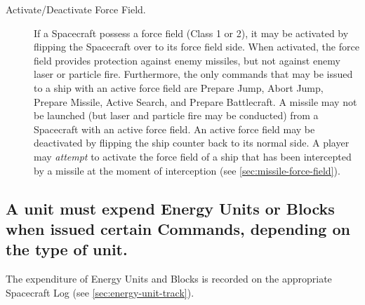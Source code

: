 \begin{description}
\item[Activate/Deactivate Force Field.] If a Spacecraft possess a
force field (Class 1 or 2), it may be activated by flipping the
Spacecraft over to its force field side. When activated, the force
field provides protection against enemy missiles, but not against
enemy laser or particle fire. Furthermore, the only commands that may
be issued to a ship with an active force field are Prepare Jump, Abort
Jump, Prepare Missile, Active Search, and Prepare Battlecraft. A
missile may not be launched (but laser and particle fire may be
conducted) from a Spacecraft with an active force field. An active
force field may be deactivated by flipping the ship counter back to
its normal side.  A player may \emph{attempt} to activate the force
field of a ship that has been intercepted by a missile at the moment
of interception (see \ref{sec:missile-force-field}).
\end{description}

\subsection[Commands And Energy]{A unit must expend Energy Units or
  Blocks when issued 
  certain Commands, depending on the type of unit.}
\label{sec:commands-energy}



The expenditure of Energy Units and Blocks is recorded on the
appropriate Spacecraft Log (see \ref{sec:energy-unit-track}).


